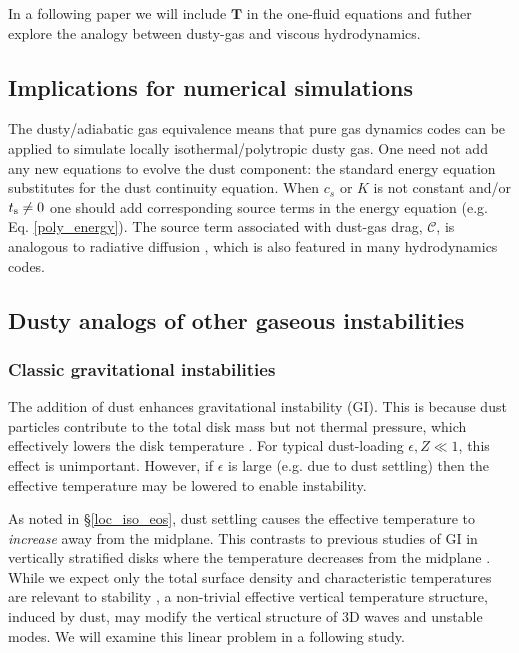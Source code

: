 In a following paper we will include $\bm{T}$ in the one-fluid
equations and futher explore the analogy between dusty-gas and viscous
hydrodynamics. 





\subsection{Implications for numerical simulations}
The dusty/adiabatic gas equivalence means that pure
gas dynamics codes can be applied to simulate locally
isothermal/polytropic dusty gas. One need not add any new 
equations to evolve the dust component: 
 the standard energy equation substitutes for the dust continuity
equation. When $c_s$ or $K$ is not constant and/or $t_\mathrm{s}\neq0$ one
should add corresponding source terms in the energy equation
(e.g. Eq. \ref{poly_energy}). 
The source term associated with dust-gas drag, $\mathcal{C}$, is 
analogous to radiative diffusion \citep{price15}, which is also
featured in many hydrodynamics codes.      

\subsection{Dusty analogs of other gaseous instabilities}  


\subsubsection{Classic gravitational instabilities} %
The addition of dust enhances gravitational
instability (GI). This is because dust particles contribute to the
total disk mass but not thermal pressure, which effectively lowers the
disk temperature \citep[][]{thompson88,shi13}. For typical dust-loading 
$\epsilon, Z\ll1$, this effect is unimportant. However, if $\epsilon$ is
large (e.g. due to dust settling) then the effective temperature may 
be lowered to enable instability. 

As noted in \S\ref{loc_iso_eos}, dust settling causes the effective
temperature to \emph{increase} away from the midplane. This contrasts
to previous studies of GI in vertically stratified disks
 where the temperature decreases
from the midplane \citep[e.g.][]{mamat10, kim12,lin14c}. 
While we expect only the total surface density and
characteristic temperatures are relevant to stability  
\citep{toomre64}, a non-trivial effective vertical temperature
structure, induced by dust, may modify the vertical structure of 3D
waves and unstable modes. We will examine this linear problem in a following 
study.  

